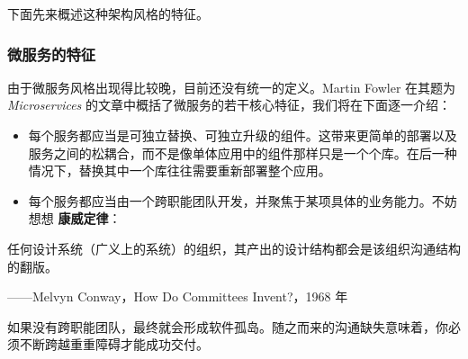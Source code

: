 \label{idx:099}
下面先来概述这种架构风格的特征。

\subsubsection{微服务的特征}

\label{idx:100}
由于微服务风格出现得比较晚，目前还没有统一的定义。Martin Fowler 在其题为 \emph{Microservices} 的文章中概括了微服务的若干核心特征，我们将在下面逐一介绍：

\begin{itemize}
\item 每个服务都应当是可独立替换、可独立升级的组件。这带来更简单的部署以及服务之间的松耦合，而不是像单体应用中的组件那样只是一个个库。在后一种情况下，替换其中一个库往往需要重新部署整个应用。
\item 每个服务都应当由一个跨职能团队开发，并聚焦于某项具体的业务能力。不妨想想 \textbf{康威定律}：
\end{itemize}

\begin{myQuote}
任何设计系统（广义上的系统）的组织，其产出的设计结构都会是该组织沟通结构的翻版。

——Melvyn Conway，How Do Committees Invent?，1968 年

\end{myQuote}

\label{idx:101}
如果没有跨职能团队，最终就会形成软件孤岛。随之而来的沟通缺失意味着，你必须不断跨越重重障碍才能成功交付。

